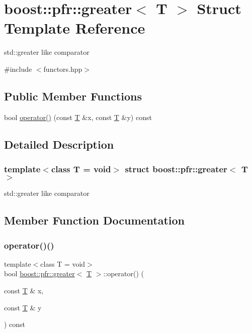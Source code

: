 \hypertarget{structboost_1_1pfr_1_1greater}{}\section{boost\+:\+:pfr\+:\+:greater$<$ T $>$ Struct Template Reference}
\label{structboost_1_1pfr_1_1greater}


std\+::greater like comparator  




{\ttfamily \#include $<$functors.\+hpp$>$}

\subsection*{Public Member Functions}
\begin{DoxyCompactItemize}
\item 
bool \mbox{\hyperlink{structboost_1_1pfr_1_1greater_a529518f4b8324e50200d0e5d2acc7de2}{operator()}} (const \mbox{\hyperlink{struct_t}{T}} \&x, const \mbox{\hyperlink{struct_t}{T}} \&y) const
\end{DoxyCompactItemize}


\subsection{Detailed Description}
\subsubsection*{template$<$class T = void$>$\newline
struct boost\+::pfr\+::greater$<$ T $>$}

std\+::greater like comparator 

\subsection{Member Function Documentation}
\mbox{\label{structboost_1_1pfr_1_1greater_a529518f4b8324e50200d0e5d2acc7de2}} 
\subsubsection{\texorpdfstring{operator()()}{operator()()}}
{\footnotesize\ttfamily template$<$class T  = void$>$ \\
bool \mbox{\hyperlink{structboost_1_1pfr_1_1greater}{boost\+::pfr\+::greater}}$<$ \mbox{\hyperlink{struct_t}{T}} $>$\+::operator() (\begin{DoxyParamCaption}\item[{const \mbox{\hyperlink{struct_t}{T}} \&}]{x,  }\item[{const \mbox{\hyperlink{struct_t}{T}} \&}]{y }\end{DoxyParamCaption}) const\hspace{0.3cm}{\ttfamily [inline]}}

